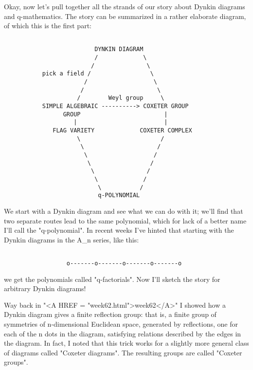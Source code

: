 


Okay, now let's pull together all the strands of our story about
Dynkin diagrams and q-mathematics.   The story can be summarized
in a rather elaborate diagram, of which this is the first part:



\begin{verbatim}

                          DYNKIN DIAGRAM
                          /             \
                         /               \
           pick a field /                 \ 
                       /                   \
                      /                     \
                     /        Weyl group     \
           SIMPLE ALGEBRAIC ----------> COXETER GROUP 
                 GROUP                        | 
                    |                         | 
              FLAG VARIETY             COXETER COMPLEX 
                     \                       /
                      \                     /
                       \                   /
                        \                 /
                         \               /
                          \             /
                           \           /
                           q-POLYNOMIAL
\end{verbatim}
    
We start with a Dynkin diagram and see what we can do with it; 
we'll find that two separate routes lead to the same polynomial, 
which for lack of a better name I'll call the "q-polynomial".  
In recent weeks I've hinted that starting with the Dynkin diagrams 
in the A_{n} series, like this:


\begin{verbatim}

                  o-------o-------o-------o-------o
\end{verbatim}
    
we get the polynomials called "q-factorials".  Now I'll sketch the 
story for arbitrary Dynkin diagrams!  

Way back in "<A HREF = "week62.html">week62</A>" I showed how
a Dynkin diagram gives a finite reflection group: that is, a finite
group of symmetries of n-dimensional Euclidean space, generated by
reflections, one for each of the n dots in the diagram, satisfying
relations described by the edges in the diagram.  In fact, I noted that
this trick works for a slightly more general class of diagrams called
"Coxeter diagrams".  The resulting groups are called
"Coxeter groups".

